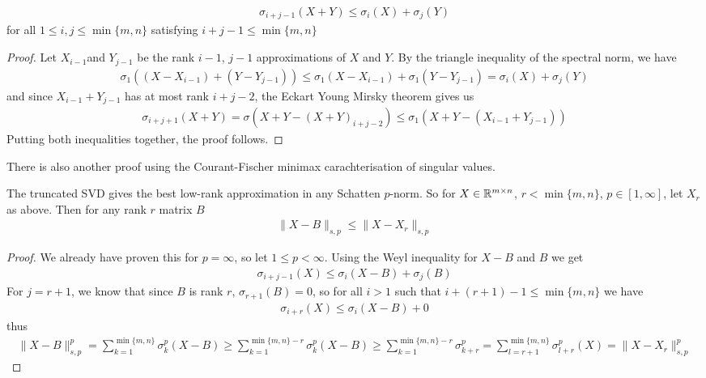 \begin{thm}
  \begin{align*}
    \sigma_{i+j -1}(X + Y) \leq \sigma_i(X) + \sigma_j(Y)
  \end{align*}
  for all $1 \leq i,j \leq \min\{m,n\}$ satisfying $i+j-1 \leq \min\{m,n\}$
\end{thm}
\begin{proof}
Let $X_{i-1}$and $Y_{j-1}$ be the rank $i-1$, $j-1$ approximations of $X$ and $Y$. By the triangle inequality of the spectral norm, we have
\begin{align*}
  \sigma_1((X - X_{i-1}) + (Y - Y_{j-1})) \leq \sigma_1(X - X_{i-1}) + \sigma_1(Y - Y_{j-1}) = \sigma_i(X) + \sigma_j(Y)
\end{align*}
and since $X_{i-1} + Y_{j-1}$ has at most rank $i+j-2$, the Eckart Young Mirsky theorem gives us
\begin{align*}
  \sigma_{i+j+1}(X+Y) = \sigma(X + Y - (X+Y)_{i+j-2}) \leq \sigma_1(X + Y - (X_{i-1} + Y_{j-1})) 
\end{align*}
Putting both inequalities together, the proof follows.
\end{proof}
There is also another proof using the Courant-Fischer minimax carachterisation of singular values.

\begin{thm}
  The truncated SVD gives the best low-rank approximation in any Schatten $p$-norm. So for $X \in \mathbb{R}^{m \times n}$, $r < \min\{m,n\}$, $p \in [1,\infty]$, let $X_r$ as above. Then for any rank $r$ matrix $B$
  \begin{align*}
    \|X - B\|_{s,p} \leq \|X - X_r\|_{s,p}
  \end{align*}
\end{thm}
\begin{proof}
  We already have proven this for $p = \infty$, so let $1 \leq p < \infty$.
  Using the Weyl inequality for $X - B$ and $B$ we get
  \begin{align*}
    \sigma_{i+j-1}(X) \leq \sigma_i(X - B) + \sigma_j(B)
  \end{align*}
  For $j = r+1$, we know that since $B$ is rank $r$, $\sigma_{r+1}(B) = 0$, so for all $i > 1$ such that $i + (r+1) - 1 \leq \min \{m,n\}$ we have
  \begin{align*}
    \sigma_{i+r}(X) \leq \sigma_i(X - B) + 0
  \end{align*}
  thus
  \begin{align*}
    \|X - B\|_{s,p}^{p} = \sum_{k=1}^{\min \{m,n\}} \sigma_k^{p}(X - B) \geq \sum_{k=1}^{\min \{m,n\} - r} \sigma_k^{p}(X-B) \geq \sum_{k=1}^{\min \{m,n\}-r} \sigma_{k+r}^{p} = \sum_{l=r+1}^{\min \{m,n\}} \sigma_{l+r}^{p}(X) = \|X-X_r\|_{s,p}^{p}
  \end{align*}

\end{proof}
